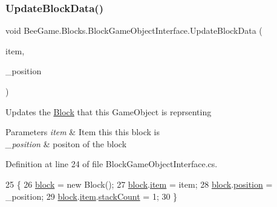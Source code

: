 \subsubsection{\texorpdfstring{Update\+Block\+Data()}{UpdateBlockData()}\hspace{0.1cm}{\footnotesize\ttfamily [1/2]}}
{\footnotesize\ttfamily void Bee\+Game.\+Blocks.\+Block\+Game\+Object\+Interface.\+Update\+Block\+Data (\begin{DoxyParamCaption}\item[{\hyperlink{struct_bee_game_1_1_items_1_1_item}{Item}}]{item,  }\item[{\hyperlink{struct_bee_game_1_1_t_h_vector3}{T\+H\+Vector3}}]{\+\_\+position }\end{DoxyParamCaption})}



Updates the \hyperlink{class_bee_game_1_1_blocks_1_1_block}{Block} that this Game\+Object is reprsenting 


\begin{DoxyParams}{Parameters}
{\em item} & Item this this block is\\
\hline
{\em \+\_\+position} & positon of the block\\
\hline
\end{DoxyParams}


Definition at line 24 of file Block\+Game\+Object\+Interface.\+cs.


\begin{DoxyCode}
25         \{
26             \hyperlink{class_bee_game_1_1_blocks_1_1_block_game_object_interface_a238bad3b956ec84c8b1cc3127948b75d}{block} = \textcolor{keyword}{new} Block();
27             \hyperlink{class_bee_game_1_1_blocks_1_1_block_game_object_interface_a238bad3b956ec84c8b1cc3127948b75d}{block}.\hyperlink{class_bee_game_1_1_blocks_1_1_block_addc8d61c8acab21b0f15df5fed804f11}{item} = item;
28             \hyperlink{class_bee_game_1_1_blocks_1_1_block_game_object_interface_a238bad3b956ec84c8b1cc3127948b75d}{block}.\hyperlink{class_bee_game_1_1_blocks_1_1_block_a4bdeec76cfc1291eab6cebcd569620e6}{position} = \_position;
29             \hyperlink{class_bee_game_1_1_blocks_1_1_block_game_object_interface_a238bad3b956ec84c8b1cc3127948b75d}{block}.\hyperlink{class_bee_game_1_1_blocks_1_1_block_addc8d61c8acab21b0f15df5fed804f11}{item}.\hyperlink{struct_bee_game_1_1_items_1_1_item_aaa169917b0e0f8472f20398d5d448388}{stackCount} = 1;
30         \}
\end{DoxyCode}
\mbox{\label{class_bee_game_1_1_blocks_1_1_block_game_object_interface_ad3f4f53d3fdb09f46f05a23faa08c12a}} 
